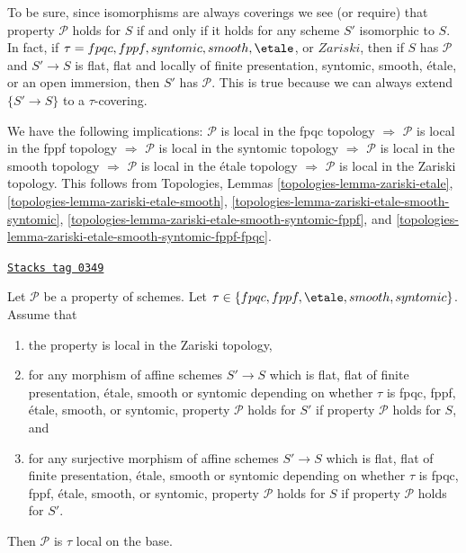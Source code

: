 To be sure, since isomorphisms are always coverings
we see (or require) that property $\mathcal{P}$ holds for $S$
if and only if it holds for any scheme $S'$ isomorphic to $S$.
In fact, if $\tau = fpqc, \linebreak[0] fppf, \linebreak[0] syntomic,
\linebreak[0] smooth, \linebreak[0] \etale$, or $Zariski$, then
if $S$ has $\mathcal{P}$ and $S' \to S$ is
flat, flat and locally of finite presentation, syntomic, smooth, \'etale, or
an open immersion, then $S'$ has $\mathcal{P}$. This is true because
we can always extend $\{S' \to S\}$ to a $\tau$-covering.

\medskip\noindent
We have the following implications:
$\mathcal{P}$ is local in the fpqc topology
$\Rightarrow$
$\mathcal{P}$ is local in the fppf topology
$\Rightarrow$
$\mathcal{P}$ is local in the syntomic topology
$\Rightarrow$
$\mathcal{P}$ is local in the smooth topology
$\Rightarrow$
$\mathcal{P}$ is local in the \'etale topology
$\Rightarrow$
$\mathcal{P}$ is local in the Zariski topology.
This follows from
Topologies, Lemmas
\ref{topologies-lemma-zariski-etale},
\ref{topologies-lemma-zariski-etale-smooth},
\ref{topologies-lemma-zariski-etale-smooth-syntomic},
\ref{topologies-lemma-zariski-etale-smooth-syntomic-fppf}, and
\ref{topologies-lemma-zariski-etale-smooth-syntomic-fppf-fpqc}.

\begin{lemma}
\label{descent-lemma-descending-properties}
\href{https://stacks.math.columbia.edu/tag/0349}{\texttt{Stacks tag 0349}}

Let $\mathcal{P}$ be a property of schemes.
Let $\tau \in \{fpqc, \linebreak[0] fppf, \linebreak[0]
\etale, \linebreak[0] smooth, \linebreak[0] syntomic\}$.
Assume that
\begin{enumerate}
\item the property is local in the Zariski topology,
\item for any morphism of affine schemes $S' \to S$
which is flat, flat of finite presentation,
\'etale, smooth or syntomic depending on whether $\tau$ is
fpqc, fppf, \'etale, smooth, or syntomic,
property $\mathcal{P}$ holds for $S'$ if property $\mathcal{P}$
holds for $S$, and
\item for any surjective morphism of affine schemes $S' \to S$
which is flat, flat of finite presentation,
\'etale, smooth or syntomic depending on whether $\tau$ is
fpqc, fppf, \'etale, smooth, or syntomic,
property $\mathcal{P}$ holds for $S$ if property $\mathcal{P}$
holds for $S'$.
\end{enumerate}
Then $\mathcal{P}$ is $\tau$ local on the base.
\end{lemma}

